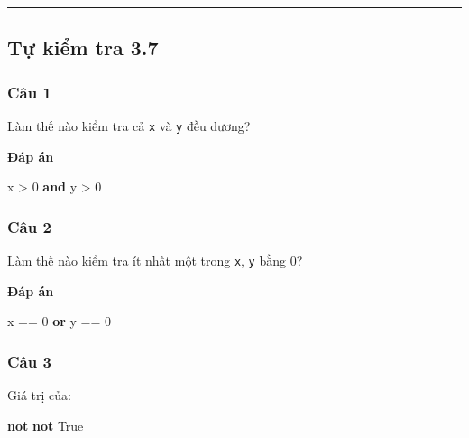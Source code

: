 \documentclass[
  11pt,
  a4paper,
]{article}
\newenvironment{Shaded}{}{}
\newcommand{\DecValTok}[1]{\textcolor[rgb]{0.25,0.63,0.44}{#1}}
\newcommand{\KeywordTok}[1]{\textcolor[rgb]{0.00,0.44,0.13}{\textbf{#1}}}
\newcommand{\NormalTok}[1]{#1}
\newcommand{\OperatorTok}[1]{\textcolor[rgb]{0.40,0.40,0.40}{#1}}
\newcommand{\VariableTok}[1]{\textcolor[rgb]{0.10,0.09,0.49}{#1}}
\begin{document}
\begin{center}\rule{0.5\linewidth}{0.5pt}\end{center}

\subsection{Tự kiểm tra 3.7}\label{tux1ef1-kiux1ec3m-tra-3.7}

\subsubsection{Câu 1}\label{cuxe2u-1-6}

Làm thế nào kiểm tra cả \texttt{x} và \texttt{y} đều dương?

\textbf{Đáp án}

\begin{Shaded}
\begin{Highlighting}[]
\NormalTok{x }\OperatorTok{\textgreater{}} \DecValTok{0} \KeywordTok{and}\NormalTok{ y }\OperatorTok{\textgreater{}} \DecValTok{0}
\end{Highlighting}
\end{Shaded}

\subsubsection{Câu 2}\label{cuxe2u-2-6}

Làm thế nào kiểm tra ít nhất một trong \texttt{x}, \texttt{y} bằng 0?

\textbf{Đáp án}

\begin{Shaded}
\begin{Highlighting}[]
\NormalTok{x }\OperatorTok{==} \DecValTok{0} \KeywordTok{or}\NormalTok{ y }\OperatorTok{==} \DecValTok{0}
\end{Highlighting}
\end{Shaded}

\subsubsection{Câu 3}\label{cuxe2u-3-3}

Giá trị của:

\begin{Shaded}
\begin{Highlighting}[]
\KeywordTok{not} \KeywordTok{not} \VariableTok{True}
\end{Highlighting}
\end{Shaded}
\end{document}
